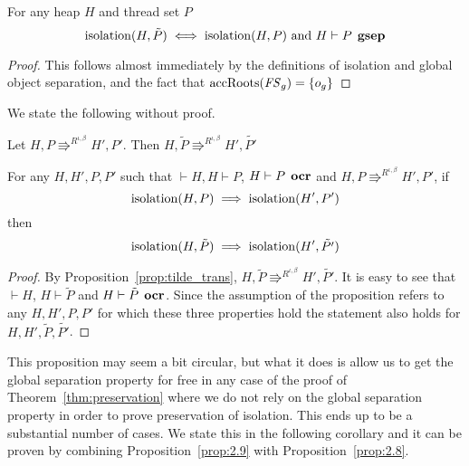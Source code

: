 \begin{proposition} \label{prop:2.8}
  For any heap $H$ and thread set $P$
  \begin{equation*}
    \mbox{$\mathrm{isolation}$}{(H, \tilde{P})} \iff \mbox{$\mathrm{isolation}$}{(H, P)} \text{ and } H \vdash P
    \:\: \mbox{\bf gsep} 
  \end{equation*}
\end{proposition}

\begin{proof}
  This follows almost immediately by the definitions of isolation and global
  object separation, and the fact that $\mbox{$\mathrm{accRoots}$}(\mathit{FS}_g) = \left\{
    o_g \right\}$ 
\end{proof}

We state the following without proof.
\begin{proposition} \label{prop:tilde_trans}
  Let $H, P \Rrightarrow^{R^{\iota, \beta}} H', P'$. Then $H, \tilde{P}
  \Rrightarrow^{R^{\iota, \beta}} H', \tilde{P'}$
\end{proposition}

\begin{proposition} \label{prop:2.9}
  For any $H, H', P, P'$ such that $\vdash H, H \vdash P$, $H \vdash P \:\:
  \mbox{\bf ocr}$ and $H, P \Rrightarrow^{R^{\iota, \beta}} H', P'$, if
  \begin{equation*}
      \mbox{$\mathrm{isolation}$}(H, P) 
      \implies 
      \mbox{$\mathrm{isolation}$}(H', P')
  \end{equation*}
  then
  \begin{equation*}
    \mbox{$\mathrm{isolation}$}(H, \tilde{P}) \implies \mbox{$\mathrm{isolation}$}(H', \tilde{P'})
  \end{equation*}
\end{proposition}

\begin{proof}
  By Proposition~\ref{prop:tilde_trans}, $H, \tilde{P} \Rrightarrow^{R^{\iota,
  \beta}} H', \tilde{P'}$. It is easy to see that $\vdash H$, $H \vdash
  \tilde{P}$ and $H \vdash \tilde{P} \:\: \mbox{\bf ocr}$.
  Since the assumption of the proposition refers to any $H, H', P, P'$ for which
  these three properties hold the statement also holds for $H, H',
  \tilde{P}, \tilde{P'}$.
\end{proof}

\begin{remark}
  This proposition may seem a bit circular, but what it does is allow us to get
  the global separation property for free in any case of the proof of
  Theorem~\ref{thm:preservation} where we do not rely on the global separation
  property in order to prove preservation of isolation. This ends up to be a
  substantial number of cases. We state this in the following corollary and it
  can be proven by combining Proposition~\ref{prop:2.9} with
  Proposition~\ref{prop:2.8}. 
\end{remark}

